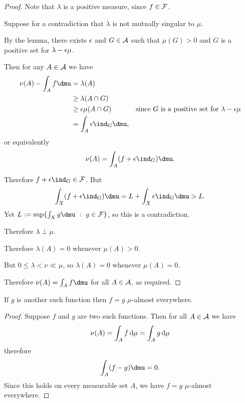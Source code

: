 \begin{proof}
  Note that $\lambda$ is a positive measure, since $f \in \mathcal F$.

  Suppose for a contradiction that $\lambda$ is not mutually singular to $\mu$.

  By the lemma, there exists $\epsilon$ and $G \in \mathcal A$ such that $\mu(G) > 0$ and $G$ is a positive set
  for $\lambda - \epsilon\mu$.

  Then for any $A \in \mathcal A$ we have
  \begin{align*}
    \nu(A) - \int_A f \dmu
    &= \lambda(A) \\
    &\geq \lambda(A \cap G) \\
    &\geq \eps\mu(A \cap G) &\text{since $G$ is a positive set for $\lambda - \eps\mu$} \\
    &=\int_A \eps\ind_{G} \dmu,
  \end{align*}
  or equivalently
  \begin{align*}
    \nu(A) = \int_A (f + \eps\ind_G) \dmu.
  \end{align*}

  Therefore $f + \eps\ind_G \in \mc F$. But
  \begin{align*}
    \int_X (f + \eps\ind_G) \dmu = L + \int_X\eps\ind_G \dmu > L.
  \end{align*}
  Yet $L := \sup \{\int_X g \dmu ~:~ g \in \mc F\}$, so this is a contradiction.

  Therefore $\lambda \perp \mu$.

  Therefore $\lambda(A) = 0$ whenever $\mu(A) > 0$.

  But $0 \leq \lambda < \nu \ll \mu$, so $\lambda(A) = 0$ whenever $\mu(A) = 0$.

  Therefore $\nu(A) = \int_A f \dmu$ for all $A \in \mathcal A$, as required.
\end{proof}










\begin{claim*}
  If $g$ is another such function then $f = g$ $\mu$-almost everywhere.
\end{claim*}

\begin{proof}
    Suppose $f$ and $g$ are two such functions. Then for all $A \in \mathcal A$ we have
  \begin{align*}
    \nu(A) = \int_A f \d\mu = \int_A g \d\mu
  \end{align*}
  therefore
  \begin{align*}
    \int_A (f - g) \dmu = 0.
  \end{align*}
  Since this holds on every measurable set $A$, we have $f = g$ $\mu$-almost everywhere.
\end{proof}
